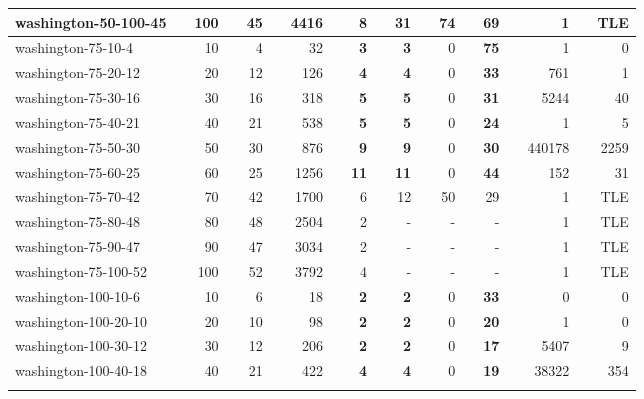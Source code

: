 \begin{table}[!ht]
{\begin{tabular}{llrlrlrlrlrlrlrlrlr}
\rowcolor[HTML]{C0C0C0} 
washington-50-100-45 &  & 100 &  & 45 &  & 4416 &  & 8 &  & 31 &  & 74 &  & 69 &  & 1 &  & TLE \\ \hline
\rowcolor[HTML]{9B9B9B} 
washington-75-10-4 &  & 10 &  & 4 &  & 32 &  & \textbf{3} &  & \textbf{3} &  & 0 &  & \textbf{75} &  & 1 &  & 0 \\
\rowcolor[HTML]{9B9B9B} 
washington-75-20-12 &  & 20 &  & 12 &  & 126 &  & \textbf{4} &  & \textbf{4} &  & 0 &  & \textbf{33} &  & 761 &  & 1 \\
\rowcolor[HTML]{9B9B9B} 
washington-75-30-16 &  & 30 &  & 16 &  & 318 &  & \textbf{5} &  & \textbf{5} &  & 0 &  & \textbf{31} &  & 5244 &  & 40 \\
\rowcolor[HTML]{9B9B9B} 
washington-75-40-21 &  & 40 &  & 21 &  & 538 &  & \textbf{5} &  & \textbf{5} &  & 0 &  & \textbf{24} &  & 1 &  & 5 \\
\rowcolor[HTML]{9B9B9B} 
washington-75-50-30 &  & 50 &  & 30 &  & 876 &  & \textbf{9} &  & \textbf{9} &  & 0 &  & \textbf{30} &  & 440178 &  & 2259 \\
\rowcolor[HTML]{9B9B9B} 
washington-75-60-25 &  & 60 &  & 25 &  & 1256 &  & \textbf{11} &  & \textbf{11} &  & 0 &  & \textbf{44} &  & 152 &  & 31 \\
\rowcolor[HTML]{C0C0C0} 
washington-75-70-42 &  & 70 &  & 42 &  & 1700 &  & 6 &  & 12 &  & 50 &  & 29 &  & 1 &  & TLE \\
washington-75-80-48 &  & 80 &  & 48 &  & 2504 &  & 2 &  & - &  & - &  & - &  & 1 &  & TLE \\
washington-75-90-47 &  & 90 &  & 47 &  & 3034 &  & 2 &  & - &  & - &  & - &  & 1 &  & TLE \\
washington-75-100-52 &  & 100 &  & 52 &  & 3792 &  & 4 &  & - &  & - &  & - &  & 1 &  & TLE \\ \hline
\rowcolor[HTML]{9B9B9B} 
washington-100-10-6 &  & 10 &  & 6 &  & 18 &  & \textbf{2} &  & \textbf{2} &  & 0 &  & \textbf{33} &  & 0 &  & 0 \\
\rowcolor[HTML]{9B9B9B} 
washington-100-20-10 &  & 20 &  & 10 &  & 98 &  & \textbf{2} &  & \textbf{2} &  & 0 &  & \textbf{20} &  & 1 &  & 0 \\
\rowcolor[HTML]{9B9B9B} 
washington-100-30-12 &  & 30 &  & 12 &  & 206 &  & \textbf{2} &  & \textbf{2} &  & 0 &  & \textbf{17} &  & 5407 &  & 9 \\
\rowcolor[HTML]{9B9B9B} 
washington-100-40-18 &  & 40 &  & 21 &  & 422 &  & \textbf{4} &  & \textbf{4} &  & 0 &  & \textbf{19} &  & 38322 &  & 354 \\
\rowcolor[HTML]{C0C0C0} 

\end{tabular}}
\end{table}
